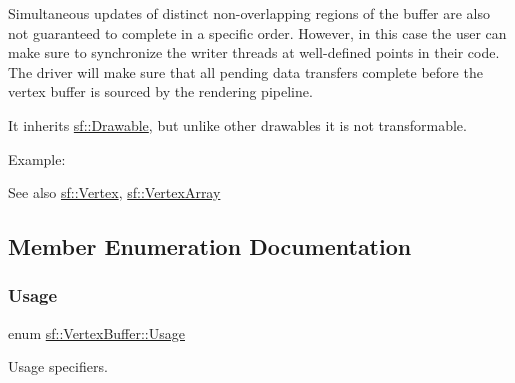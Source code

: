 Simultaneous updates of distinct non-\/overlapping regions of the buffer are also not guaranteed to complete in a specific order. However, in this case the user can make sure to synchronize the writer threads at well-\/defined points in their code. The driver will make sure that all pending data transfers complete before the vertex buffer is sourced by the rendering pipeline.

It inherits \mbox{\hyperlink{classsf_1_1_drawable}{sf\+::\+Drawable}}, but unlike other drawables it is not transformable.

Example\+: 
\begin{DoxyCode}{0}
\end{DoxyCode}


\begin{DoxySeeAlso}{See also}
\mbox{\hyperlink{classsf_1_1_vertex}{sf\+::\+Vertex}}, \mbox{\hyperlink{classsf_1_1_vertex_array}{sf\+::\+Vertex\+Array}} \begin{DoxyVerb}\end{DoxyVerb}
 
\end{DoxySeeAlso}


\subsection{Member Enumeration Documentation}
\mbox{\label{classsf_1_1_vertex_buffer_a3a531528684e63ecb45edd51282f5cb7}} 
\subsubsection{\texorpdfstring{Usage}{Usage}}
{\footnotesize\ttfamily enum \mbox{\hyperlink{classsf_1_1_vertex_buffer_a3a531528684e63ecb45edd51282f5cb7}{sf\+::\+Vertex\+Buffer\+::\+Usage}}}



Usage specifiers. 

